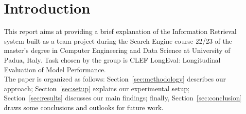 \section{Introduction}
\label{sec:introduction}


This report aims at providing a brief explanation of the Information Retrieval system built
as a team project during the Search Engine course 22/23 of the master’s degree in Computer
Engineering and Data Science at University of Padua, Italy.
Task chosen by the group is CLEF LongEval: Longitudinal Evaluation of Model Performance.\\

The paper is organized as follows: Section~\ref{sec:methodology} describes our approach;
Section~\ref{sec:setup} explains our experimental setup;
Section~\ref{sec:results} discusses our main findings; finally,
Section~\ref{sec:conclusion} draws some conclusions and outlooks for future work.